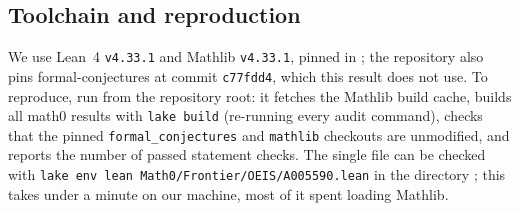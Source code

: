 \documentclass[11pt]{amsart}
\theoremstyle{plain}
\theoremstyle{definition}
\begin{document}
\subsection*{Toolchain and reproduction}
We use Lean~4 \cite{Lean4} \texttt{v4.33.1} and Mathlib \cite{Mathlib} \texttt{v4.33.1}, pinned in ; the repository also pins formal-conjectures \cite{FC} at commit \texttt{c77fdd4}, which this result does not use.
To reproduce, run  from the repository root: it fetches the Mathlib build cache, builds all math0 results with \texttt{lake build} (re-running every audit command), checks that the pinned \texttt{formal\_conjectures} and \texttt{mathlib} checkouts are unmodified, and reports the number of passed statement checks. The single file can be checked with \texttt{lake env lean Math0/Frontier/OEIS/A005590.lean} in the directory ; this takes under a minute on our machine, most of it spent loading Mathlib.
\end{document}

